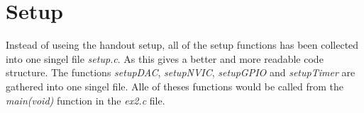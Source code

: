 \section{Setup}
Instead of useing the handout setup, all of the setup functions has been collected into one singel file \emph{setup.c}.
As this gives a better and more readable code structure.
The functions \emph{setupDAC}, \emph{setupNVIC}, \emph{setupGPIO} and \emph{setupTimer} are gathered into one singel file.
Alle of theses functions would be called from the \emph{main(void)} function in the \emph{ex2.c} file.
